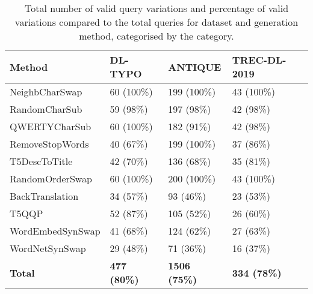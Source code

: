 \begin{table}[ht]
\centering
\caption{Total number of valid query variations and percentage of valid variations compared to the total queries for dataset and generation method, categorised by the category.}
\label{tab:valid-vars}
\begin{tabular}{l|l|l|l}
\textbf{Method}  & \textbf{DL-TYPO}    & \textbf{ANTIQUE}   & \textbf{TREC-DL-2019} \\ \hline
NeighbCharSwap   & 60 (100\%)          & 199 (100\%)        & 43 (100\%)            \\
RandomCharSub    & 59 (98\%)           & 197 (98\%)         & 42 (98\%)             \\
QWERTYCharSub    & 60 (100\%)          & 182 (91\%)         & 42 (98\%)             \\ \hline
RemoveStopWords  & 40 (67\%)           & 199 (100\%)        & 37 (86\%)             \\
T5DescToTitle    & 42 (70\%)           & 136 (68\%)         & 35 (81\%)             \\ \hline
RandomOrderSwap  & 60 (100\%)          & 200 (100\%)        & 43 (100\%)            \\ \hline
BackTranslation  & 34 (57\%)           & 93 (46\%)          & 23 (53\%)             \\
T5QQP            & 52 (87\%)           & 105 (52\%)         & 26 (60\%)             \\
WordEmbedSynSwap & 41 (68\%)           & 124 (62\%)         & 27 (63\%)             \\
WordNetSynSwap   & 29 (48\%)           & 71 (36\%)          & 16 (37\%)             \\ \hline
\textbf{Total}   & \textbf{477 (80\%)} & \textbf{1506 (75\%)} & \textbf{334 (78\%)}     \\ \hline
\end{tabular}%
\end{table}

